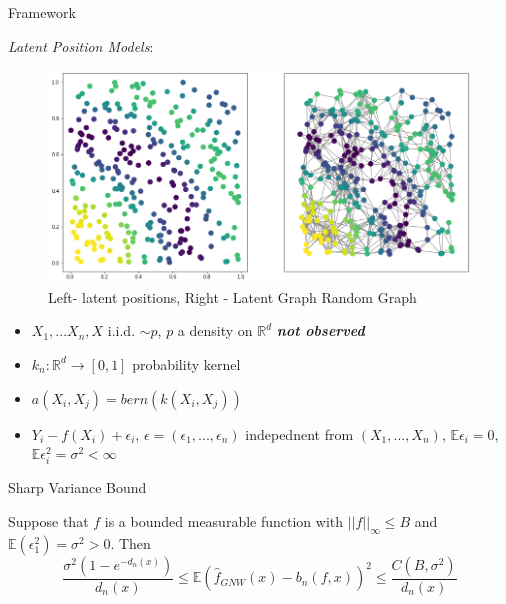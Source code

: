 \documentclass[final,dvipsnames]{beamer}
\newcommand{\mycolbackwhite}[1]{
\hspace*{.01\linewidth}\begin{minipage}{.96\linewidth}
\begin{mdframed}[backgroundcolor=white!10,linewidth=1pt]
\vspace{10pt}
#1
\vspace{10pt}
\end{mdframed}
\end{minipage}
}
\begin{document}
\begin{frame}
\begin{columns}[T]
\begin{column}{.6\textwidth}
\begin{block}{Framework}

\textit{Latent Position Models}:
\begin{figure}
    \centering
    \includegraphics[width=\textwidth]{lpm_image_correct.png}
    \caption{Left- latent positions, Right - Latent Graph Random Graph}
    \label{fig:my_label}
\end{figure}
\begin{itemize}
    \item $X_1,...X_n,X$ i.i.d. $\sim p$, $p$ a density on $\mathbb{R}^d$
    \textit{\textbf{not observed}}
    \item $k_n:\mathbb{R}^d\to [0,1]$ probability kernel 
    \item $a(X_i,X_j)=bern(k(X_i,X_j))$
\end{itemize}
\begin{itemize}
    \item $Y_i-f(X_i)+\epsilon_i$, $\epsilon=(\epsilon_1,...,\epsilon_n)$ indepednent from $(X_1,...,X_n)$, $\mathbb{E}\epsilon_i=0$, $\mathbb{E}\epsilon_i^2
    =\sigma^2<\infty$
\end{itemize}

\end{block}



\begin{block}{Sharp Variance Bound}

\mycolbackwhite{Suppose that $f$ is a bounded measurable function with $||f||_{\infty}\leq B$ and $\mathbb{E}(\epsilon_1^2)=\sigma^2>0$. Then
\begin{equation*}
    \frac{\sigma^2(1-e^{-d_n(x)})}{d_n(x)}\leq \mathbb{E}(\hat{f}_{GNW}(x)-b_n(f,x))^2\leq \frac{C(B,\sigma^2)}{d_n(x)}
\end{equation*}
}
\end{block}



\end{column}
\end{columns}
\end{frame}
\end{document}
